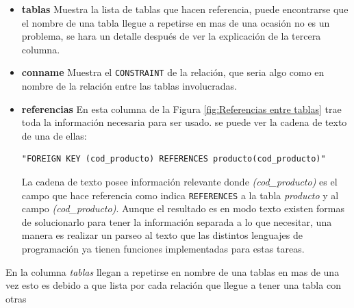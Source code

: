 \begin{itemize}
\item \textbf{tablas} Muestra la lista de tablas que hacen referencia, puede encontrarse que el nombre de una tabla llegue a repetirse en mas de una ocasi\'on no es un problema, se hara un detalle despu\'es de ver la explicaci\'on de la tercera columna.   
\item \textbf{conname} Muestra el \texttt{CONSTRAINT} de la relaci\'on, que seria algo como en nombre de la relaci\'on entre las tablas involucradas. 
\item \textbf{referencias} En esta columna de la Figura \ref{fig:Referencias entre tablas} trae toda la informaci\'on necesaria para ser usado. se puede ver la cadena de texto de una de ellas:
\lstset{language=sql,breaklines=true}
\begin{lstlisting}
"FOREIGN KEY (cod_producto) REFERENCES producto(cod_producto)"
\end{lstlisting}
La cadena de texto posee informaci\'on relevante donde \emph{(cod\_producto)} es el campo que hace referencia como indica \texttt{REFERENCES} a la tabla \emph{producto} y al campo  \emph{(cod\_producto)}.
Aunque el resultado es en modo texto existen formas de solucionarlo para tener la informaci\'on separada a lo que necesitar, una manera es realizar un parseo al texto que las distintos lenguajes de programaci\'on ya tienen funciones implementadas para estas tareas. 
\end{itemize}
En la columna \emph{tablas} llegan a repetirse en nombre de una tablas en mas de una vez esto es debido a que lista por cada relaci\'on que llegue a tener una tabla con otras
